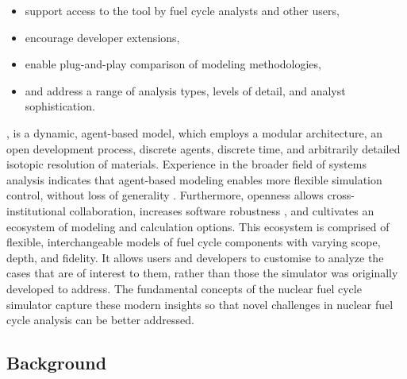 \begin{itemize}
\item support access to the tool by fuel cycle analysts and other users,
\item encourage developer extensions,
\item enable plug-and-play comparison of modeling methodologies,
\item and address a range of analysis types, levels of detail, and analyst sophistication.
\end{itemize}

\Cyclus, is a dynamic, agent-based model, which employs a modular architecture,
an open development process, discrete agents, discrete time, and arbitrarily
detailed isotopic resolution of materials. Experience in the broader field of
systems analysis indicates that agent-based modeling enables more flexible
simulation control, without loss of generality
\cite{macal_agent-based_2010}. Furthermore, openness allows cross-institutional
collaboration, increases software robustness \cite{cohen_modern_2010}, and
cultivates an ecosystem of modeling and calculation options. This ecosystem is
comprised of flexible, interchangeable models of fuel cycle components with
varying scope, depth, and fidelity. It allows users and developers to customise
\Cyclus to analyze the cases that are of interest to them, rather than those the
simulator was originally developed to address.  The fundamental concepts of the
\Cyclus nuclear fuel cycle simulator capture these modern insights so that novel
challenges in nuclear fuel cycle analysis can be better addressed.

\subsection{Background}



